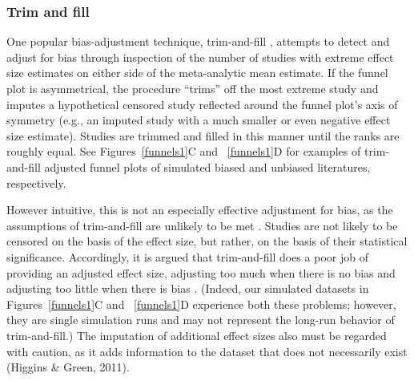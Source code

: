 \documentclass[man]{apa6}
\begin{document}
\subsubsection{Trim and fill}
One popular bias-adjustment technique, trim-and-fill \citep{Duval:Tweedie:2000}, attempts to detect and adjust for bias through inspection of the number of studies with extreme effect size estimates on either side of the meta-analytic mean estimate. If the funnel plot is asymmetrical, the procedure ``trims'' off the most extreme study and imputes a hypothetical censored study reflected around the funnel plot's axis of symmetry (e.g., an imputed study with a much smaller or even negative effect size estimate). Studies are trimmed and filled in this manner until the ranks are roughly equal. See Figures~\ref{funnels1}C and ~\ref{funnels1}D for examples of trim-and-fill adjusted funnel plots of simulated biased and unbiased literatures, respectively. 

However intuitive, this is not an especially effective adjustment for bias, as the assumptions of trim-and-fill are unlikely to be met \citep{Simonsohn:etal:2014b}. Studies are not likely to be censored on the basis of the effect size, but rather, on the basis of their statistical significance. Accordingly, it is argued that trim-and-fill does a poor job of providing an adjusted effect size, adjusting too much when there is no bias and adjusting too little when there is bias \citep{Simonsohn:etal:2014b}. %
(Indeed, our simulated datasets in Figures~\ref{funnels1}C and ~\ref{funnels1}D experience both these problems; however, they are single simulation runs and may not represent the long-run behavior of trim-and-fill.) %
The imputation of additional effect sizes also must be regarded with caution, as it adds information to the dataset that does not necessarily exist (Higgins \& Green, 2011). 
\nocite{Higgins:Green:2011}
\end{document}

